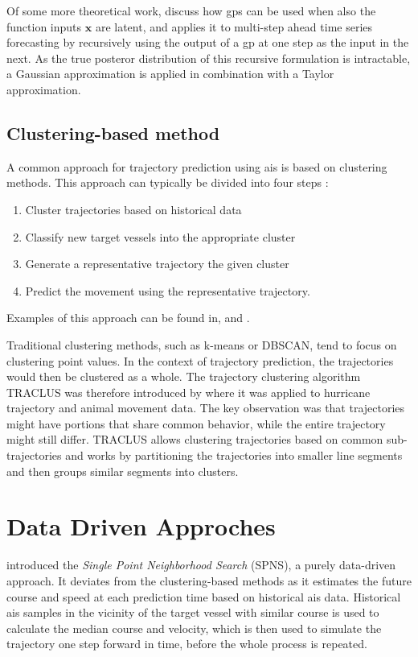 Of some more theoretical work, \citeauthor{multistep_gp}\cite{multistep_gp} discuss how \acrshort{gp}s can be used when also the function inputs $\boldsymbol{x}$ are latent, and applies it to multi-step ahead time series forecasting by recursively using the output of a \acrshort{gp} at one step as the input in the next. As the true posteror distribution of this recursive formulation is intractable, a Gaussian approximation is applied in combination with a Taylor approximation.




\subsection{Clustering-based method}
A common approach for trajectory prediction using \acrshort{ais} is based on clustering methods. This approach can typically be divided into four steps \cite{dalsnes-hexeberg}:

\begin{enumerate}
    \item Cluster trajectories based on historical data
    \item Classify new target vessels into the appropriate cluster
    \item Generate a representative trajectory the given cluster
    \item Predict the movement using the representative trajectory.
\end{enumerate}

Examples of this approach can be found in\cite{palotta}, \cite{mazzarella} and \cite{mazzarella2}. 


Traditional clustering methods, such as k-means or DBSCAN, tend to focus on clustering point values. In the context of trajectory prediction, the trajectories would then be clustered as a whole. The trajectory clustering algorithm TRACLUS was therefore introduced by \cite{traclus} where it was applied to hurricane trajectory and animal movement data. The key observation was that trajectories might have portions that share common behavior, while the entire trajectory might still differ. TRACLUS allows clustering trajectories based on common sub-trajectories and works by partitioning the trajectories into smaller line segments and then groups similar segments into clusters. 

\section{Data Driven Approches}
\citeauthor{Hexeberg2017AISbasedVT} \cite{Hexeberg2017AISbasedVT} introduced the \textit{Single Point Neighborhood Search} (SPNS), a purely data-driven approach. It deviates from the clustering-based methods as it estimates the future course and speed at each prediction time based on historical \acrshort{ais} data. 
Historical \acrshort{ais} samples in the vicinity of the target vessel with similar course is used to calculate the median course and velocity, which is then used to simulate the trajectory one step forward in time, before the whole process is repeated. 

